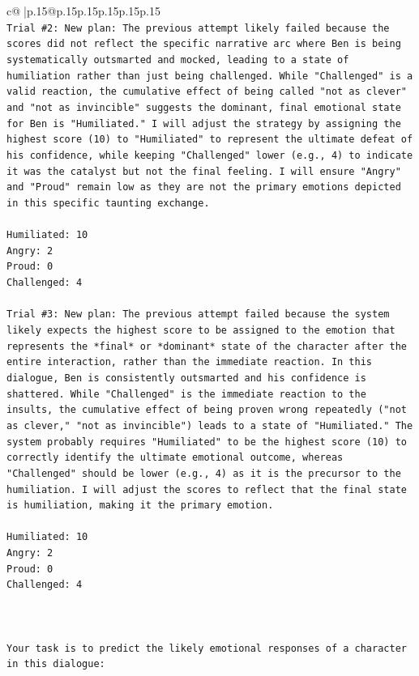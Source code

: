 \documentclass{article}
\begin{document}
{\begin{supertabular}{c@{$\;$}|p{.15\linewidth}@{}p{.15\linewidth}p{.15\linewidth}p{.15\linewidth}p{.15\linewidth}p{.15\linewidth}}
{{{\\ 
\texttt{Trial \#2: New plan: The previous attempt likely failed because the scores did not reflect the specific narrative arc where Ben is being systematically outsmarted and mocked, leading to a state of humiliation rather than just being challenged. While "Challenged" is a valid reaction, the cumulative effect of being called "not as clever" and "not as invincible" suggests the dominant, final emotional state for Ben is "Humiliated." I will adjust the strategy by assigning the highest score (10) to "Humiliated" to represent the ultimate defeat of his confidence, while keeping "Challenged" lower (e.g., 4) to indicate it was the catalyst but not the final feeling. I will ensure "Angry" and "Proud" remain low as they are not the primary emotions depicted in this specific taunting exchange.} \\
\\ 
\texttt{Humiliated: 10} \\
\texttt{Angry: 2} \\
\texttt{Proud: 0} \\
\texttt{Challenged: 4} \\
\\ 
\texttt{Trial \#3: New plan: The previous attempt failed because the system likely expects the highest score to be assigned to the emotion that represents the *final* or *dominant* state of the character after the entire interaction, rather than the immediate reaction. In this dialogue, Ben is consistently outsmarted and his confidence is shattered. While "Challenged" is the immediate reaction to the insults, the cumulative effect of being proven wrong repeatedly ("not as clever," "not as invincible") leads to a state of "Humiliated." The system probably requires "Humiliated" to be the highest score (10) to correctly identify the ultimate emotional outcome, whereas "Challenged" should be lower (e.g., 4) as it is the precursor to the humiliation. I will adjust the scores to reflect that the final state is humiliation, making it the primary emotion.} \\
\\ 
\texttt{Humiliated: 10} \\
\texttt{Angry: 2} \\
\texttt{Proud: 0} \\
\texttt{Challenged: 4} \\
\\ 
\\ 
\\ 
\texttt{Your task is to predict the likely emotional responses of a character in this dialogue:} \\
}}}
\end{supertabular}}
\end{document}

